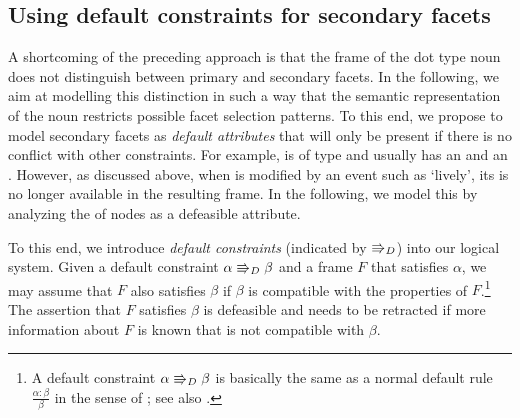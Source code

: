 \documentclass[output=paper,colorlinks,citecolor=brown,chinesefont]{langscibook}
\begin{document}


\subsection{Using default constraints for secondary facets}

A shortcoming of the preceding approach %
 is that the frame %
  of the dot type noun does not distinguish %
   between primary and secondary facets. In the following, we aim at modelling this distinction in such a way that the semantic representation of the noun restricts possible facet selection patterns.
To this end, we propose to model secondary facets as \emph{default attributes} that will only be present if there is no conflict with other constraints. 
For example,  is of type  \dott{} and usually  has an  and an . However, as discussed above, when  is modified by an event  such as `lively', its  is no longer available in the resulting frame. %
 In the following, we model this by analyzing the  of \dott{} nodes  %
 as a defeasible attribute.
 
To this end, we introduce \emph{default constraints} (indicated by $\Rrightarrow_D$) into our logical system.
Given a default constraint $\alpha\Rrightarrow_D\beta$ and a frame $F$ that satisfies $\alpha$, we may assume that $F$ also satisfies $\beta$ if $\beta$ is compatible with the properties of $F$.\footnote{A default constraint $\alpha\Rrightarrow_D\beta$ is basically the same as a normal default rule
$\frac{\alpha:\beta}{\beta}$ in the sense of \citet{Reiter:1980}; see also \citet{Osswald:2005}.}
The assertion that $F$ satisfies $\beta$ is defeasible and needs to be retracted if more information about $F$ is known that is not compatible with $\beta$.
\end{document}
